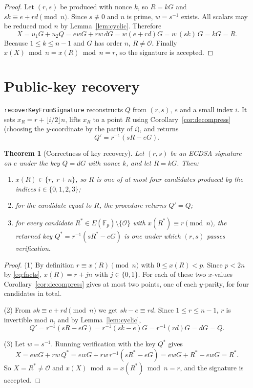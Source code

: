 \documentclass[11pt]{article}
\newtheorem{theorem}{Theorem}
\theoremstyle{definition}
\theoremstyle{remark}
\newcommand{\F}{\mathbb{F}}
\newcommand{\Oinf}{\mathcal{O}}
\begin{document}
\begin{proof}
Let $(r,s)$ be produced with nonce $k$, so $R=kG$ and $sk\equiv e+rd\pmod n$.
Since $s\not\equiv0$ and $n$ is prime, $w=s^{-1}$ exists. All scalars may be
reduced mod $n$ by Lemma~\ref{lem:cyclic}. Therefore
\[
  X = u_1G + u_2Q = ewG + rw\,dG = w(e+rd)G = w\,(sk)\,G = kG = R .
\]
Because $1\le k\le n-1$ and $G$ has order $n$, $R\ne\Oinf$. Finally
$x(X)\bmod n = x(R)\bmod n = r$, so the signature is accepted.
\end{proof}

\section{Public-key recovery}

\texttt{recoverKeyFromSignature} reconstructs $Q$ from $(r,s)$, $e$ and a small
index $i$. It sets $x_R = r + \lfloor i/2\rfloor n$, lifts $x_R$ to a point $R$
using Corollary~\ref{cor:decompress} (choosing the $y$-coordinate by the
parity of $i$), and returns
\[
  Q' = r^{-1}(sR - eG).
\]

\begin{theorem}[Correctness of key recovery]\label{thm:recover}
Let $(r,s)$ be an ECDSA signature on $e$ under the key $Q=dG$ with nonce $k$,
and let $R=kG$. Then:
\begin{enumerate}
  \item $x(R)\in\{r,\;r+n\}$, so $R$ is one of at most four candidates produced
        by the indices $i\in\{0,1,2,3\}$;
  \item for the candidate equal to $R$, the procedure returns $Q'=Q$;
  \item for \emph{every} candidate $R^\ast\in E(\F_p)\setminus\{\Oinf\}$ with
        $x(R^\ast)\equiv r\pmod n$, the returned key $Q^\ast=r^{-1}(sR^\ast-eG)$
        is one under which $(r,s)$ passes verification.
\end{enumerate}
\end{theorem}

\begin{proof}
(1) By definition $r\equiv x(R)\pmod n$ with $0\le x(R)<p$. Since $p<2n$ by
\eqref{eq:facts}, $x(R)=r+jn$ with $j\in\{0,1\}$. For each of these two
$x$-values Corollary~\ref{cor:decompress} gives at most two points, one of each
$y$-parity, for four candidates in total.

(2) From $sk\equiv e+rd \pmod n$ we get $sk-e\equiv rd$. Since
$1\le r\le n-1$, $r$ is invertible mod $n$, and by Lemma~\ref{lem:cyclic},
\[
  Q' = r^{-1}(sR - eG) = r^{-1}(sk - e)G = r^{-1}(rd)G = dG = Q .
\]

(3) Let $w=s^{-1}$. Running verification with the key $Q^\ast$ gives
\[
  X = ewG + rw\,Q^\ast = ewG + rw\,r^{-1}(sR^\ast - eG)
    = ewG + R^\ast - ewG = R^\ast .
\]
So $X=R^\ast\ne\Oinf$ and $x(X)\bmod n = x(R^\ast)\bmod n = r$, and the
signature is accepted.
\end{proof}
\end{document}
